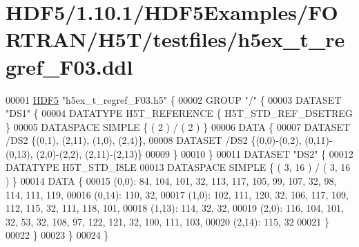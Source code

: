 \hypertarget{_h_d_f5_21_810_81_2_h_d_f5_examples_2_f_o_r_t_r_a_n_2_h5_t_2testfiles_2h5ex__t__regref___f03_8ddl_source}{}\section{H\+D\+F5/1.10.1/\+H\+D\+F5\+Examples/\+F\+O\+R\+T\+R\+A\+N/\+H5\+T/testfiles/h5ex\+\_\+t\+\_\+regref\+\_\+\+F03.ddl}
\label{_h_d_f5_21_810_81_2_h_d_f5_examples_2_f_o_r_t_r_a_n_2_h5_t_2testfiles_2h5ex__t__regref___f03_8ddl_source}

\begin{DoxyCode}
00001 \hyperlink{namespace_h_d_f5}{HDF5} \textcolor{stringliteral}{"h5ex\_t\_regref\_F03.h5"} \{
00002 GROUP \textcolor{stringliteral}{"/"} \{
00003    DATASET \textcolor{stringliteral}{"DS1"} \{
00004       DATATYPE  H5T\_REFERENCE \{ H5T\_STD\_REF\_DSETREG \}
00005       DATASPACE  SIMPLE \{ ( 2 ) / ( 2 ) \}
00006       DATA \{
00007          DATASET /DS2 \{(0,1), (2,11), (1,0), (2,4)\},
00008          DATASET /DS2 \{(0,0)-(0,2), (0,11)-(0,13), (2,0)-(2,2), (2,11)-(2,13)\}
00009       \}
00010    \}
00011    DATASET \textcolor{stringliteral}{"DS2"} \{
00012       DATATYPE  H5T\_STD\_I8LE
00013       DATASPACE  SIMPLE \{ ( 3, 16 ) / ( 3, 16 ) \}
00014       DATA \{
00015       (0,0): 84, 104, 101, 32, 113, 117, 105, 99, 107, 32, 98, 114, 111, 119,
00016       (0,14): 110, 32,
00017       (1,0): 102, 111, 120, 32, 106, 117, 109, 112, 115, 32, 111, 118, 101,
00018       (1,13): 114, 32, 32,
00019       (2,0): 116, 104, 101, 32, 53, 32, 108, 97, 122, 121, 32, 100, 111, 103,
00020       (2,14): 115, 32
00021       \}
00022    \}
00023 \}
00024 \}
\end{DoxyCode}
